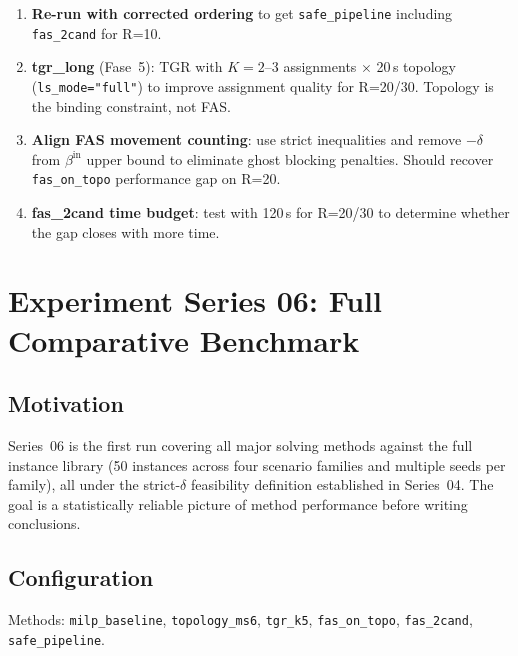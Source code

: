 \begin{enumerate}[noitemsep]
    \item \textbf{Re-run with corrected ordering} to get \texttt{safe\_pipeline}
          including \texttt{fas\_2cand} for R=10.
    \item \textbf{tgr\_long} (Fase~5): TGR with $K=2$--3 assignments $\times$
          20\,s topology (\texttt{ls\_mode="full"}) to improve assignment
          quality for R=20/30.  Topology is the binding constraint, not FAS.
    \item \textbf{Align FAS movement counting}: use strict inequalities and
          remove $-\delta$ from $\beta^{\mathrm{in}}$ upper bound to eliminate
          ghost blocking penalties.  Should recover \texttt{fas\_on\_topo}
          performance gap on R=20.
    \item \textbf{fas\_2cand time budget}: test with 120\,s for R=20/30 to
          determine whether the gap closes with more time.
\end{enumerate}

\newpage
\section{Experiment Series 06: Full Comparative Benchmark}
\label{sec:exp06}

\subsection{Motivation}

Series~06 is the first run covering all major solving methods against the
full instance library (50 instances across four scenario families and multiple
seeds per family), all under the strict-$\delta$ feasibility definition
established in Series~04.  The goal is a statistically reliable picture of
method performance before writing conclusions.

\subsection{Configuration}

Methods: \texttt{milp\_baseline}, \texttt{topology\_ms6}, \texttt{tgr\_k5},
\texttt{fas\_on\_topo}, \texttt{fas\_2cand}, \texttt{safe\_pipeline}.

